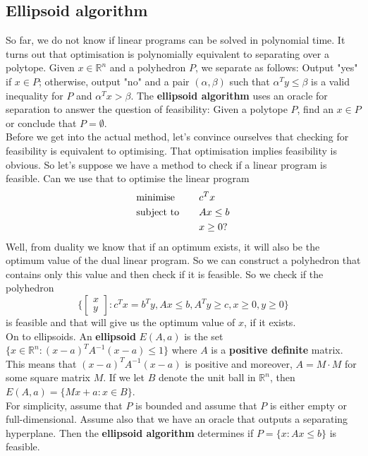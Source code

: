 \documentclass[12pt]{article}
\newcommand{\R}{\mathbb{R}}
\theoremstyle{plain}
\begin{document}
\subsection{Ellipsoid algorithm}
So far, we do not know if linear programs can be solved in polynomial time. It turns out that optimisation is polynomially equivalent to separating over a polytope. Given $x\in \R^n$ and a polyhedron $P$, we separate as follows: Output "yes" if $x\in P$; otherwise, output "no" and a pair $(\alpha, \beta)$ such that $\alpha^Ty\leq\beta$ is a valid inequality for $P$ and $\alpha^T x > \beta$. The \textbf{ellipsoid algorithm} uses an oracle for separation to answer the question of feasibility: Given a polytope $P$, find an $x\in P$ or conclude that $P = \emptyset$.\\
\indent Before we get into the actual method, let's convince ourselves that checking for feasibility is equivalent to optimising. That optimisation implies feasibility is obvious. So let's suppose we have a method to check if a linear program is feasible. Can we use that to optimise the linear program
\begin{alignat*}{2}
    & \textup{minimise} & \quad & c^Tx\\
    & \textup{subject to} & & Ax \leq b\\
    &  & & x\geq 0?
\end{alignat*}
Well, from duality we know that if an optimum exists, it will also be the optimum value of the dual linear program. So we can construct a polyhedron that contains only this value and then check if it is feasible. So we check if the polyhedron
$$\{\begin{bmatrix} x\\y\end{bmatrix} : c^Tx = b^Ty, Ax \leq b, A^Ty \geq c, x \geq 0, y\geq 0\}$$
is feasible and that will give us the optimum value of $x$, if it exists.\\
\indent On to ellipsoids. An \textbf{ellipsoid} $E(A,a)$ is the set $\{x \in \R^n : (x - a)^TA^{-1}(x-a) \leq 1\}$ where $A$ is a \textbf{positive definite} matrix. This means that $(x-a)^TA^{-1}(x-a)$ is positive and moreover, $A = M\cdot M$ for some square matrix $M$. If we let $B$ denote the unit ball in $\R^n$, then $E(A,a) = \{Mx + a : x \in B\}$.\\
\indent For simplicity, assume that $P$ is bounded and assume that $P$ is either empty or full-dimensional. Assume also that we have an oracle that outputs a separating hyperplane. Then the \textbf{ellipsoid algorithm} determines if $P = \{x : Ax \leq b\}$ is feasible.
\end{document}

